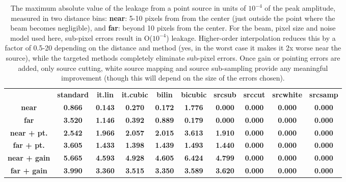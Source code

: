 \documentclass{article}
\newcommand{\good}[1]{{\color{deepgreen}\textbf{#1}}}
\newcommand{\bad}[1]{{\color{red}\textbf{#1}}}
\newcommand{\medi}[1]{{\color{orange}\textbf{#1}}}
\newcommand{\dfn}[1]{\textbf{#1}}
\begin{document}
\begin{table}
	\centering
	\begin{tabular}{cccccccccc}
			&
			\bf standard &
			\bf it.lin &
			\bf it.cubic &
			\bf bilin &
			\bf bicubic &
			\bf srcsub &
			\bf srccut &
			\bf srcwhite &
			\bf srcsamp
		\\
			\bf near &
			\bad{0.866} &
			\medi{0.143} &
			\medi{0.270} &
			\medi{0.172} &
			\bad{1.776} &
			\good{0.000} &
			\good{0.000} &
			\good{0.000} &
			\good{0.000}
		\\
			\bf far &
			\bad{3.520} &
			\bad{1.146} &
			\medi{0.392} &
			\bad{0.889} &
			\medi{0.179} &
			\good{0.000} &
			\good{0.000} &
			\good{0.000} &
			\good{0.000}
		\\
			\bf near + pt. &
			\bad{2.542} &
			\bad{1.966} &
			\bad{2.057} &
			\bad{2.015} &
			\bad{3.613} &
			\bad{1.910} &
			\good{0.000} &
			\good{0.000} &
			\good{0.000}
		\\
			\bf far + pt. &
			\bad{3.605} &
			\bad{1.433} &
			\bad{1.398} &
			\bad{1.439} &
			\bad{1.493} &
			\bad{1.440} &
			\good{0.000} &
			\good{0.000} &
			\good{0.000}
		\\
			\bf near + gain &
			\bad{5.665} &
			\bad{4.593} &
			\bad{4.928} &
			\bad{4.605} &
			\bad{6.424} &
			\bad{4.799} &
			\good{0.000} &
			\good{0.000} &
			\good{0.000}
		\\
			\bf far + gain &
			\bad{3.990} &
			\bad{3.360} &
			\bad{3.515} &
			\bad{3.350} &
			\bad{3.589} &
			\bad{3.620} &
			\good{0.000} &
			\good{0.000} &
			\good{0.000}
	\end{tabular}
	\caption{The maximum absolute value of the leakage from a point source
		in units of $10^{-4}$ of the peak amplitude, measured in two distance bins: \dfn{near}:
		5-10 pixels from from the center (just outside the point where the beam becomes negligible),
		and \dfn{far}: beyond 10 pixels from the center. For the beam, pixel size and noise model
		used here, sub-pixel errors result in O($10^{-4}$) leakage. Higher-order interpolation reduces this
		by a factor of 0.5-20 depending on the distance and method (yes, in the worst case it makes it
		2x worse near the source), while the targeted methods completely eliminate sub-pixel errors.
		Once gain or pointing errors are added, only source cutting, white source mapping and
		source sub-sampling provide any meaningful improvement (though this will depend on the
		size of the errors chosen).}
	\label{tab:srcleak}
\end{table}
\end{document}
